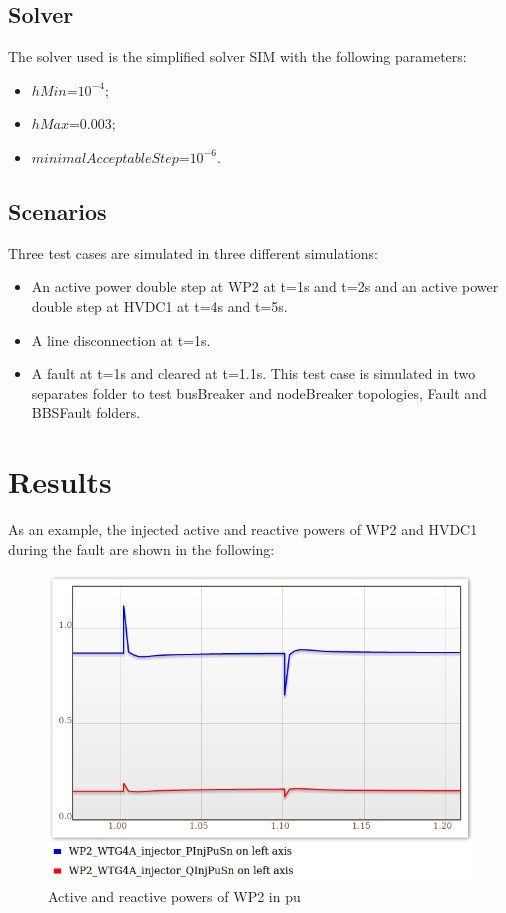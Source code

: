 \documentclass[a4paper, 12pt]{report}
\begin{document}
\subsection{Solver}

\par The solver used is the simplified solver SIM with the following parameters:

\begin{itemize}
\item $hMin$=$10^{-4}$;
\item $hMax$=$0.003$;
\item $minimalAcceptableStep$=$10^{-6}$.
\end{itemize}

\subsection{Scenarios}

\par Three test cases are simulated in three different simulations:

\begin{itemize}
\item An active power double step at WP2 at t=1s and t=2s and an active power double step at HVDC1 at t=4s and t=5s.
\item A line disconnection at t=1s.
\item A fault at t=1s and cleared at t=1.1s. This test case is simulated in two separates folder to test busBreaker and nodeBreaker topologies, Fault and BBSFault folders.
\end{itemize}

\section{Results}

\par As an example, the injected active and reactive powers of WP2 and HVDC1 during the fault are shown in the following:

\begin{figure}[H]
  \includegraphics[width=\textwidth]{PQWP2.png}
  \caption{Active and reactive powers of WP2 in pu}
\end{figure}
\end{document}
